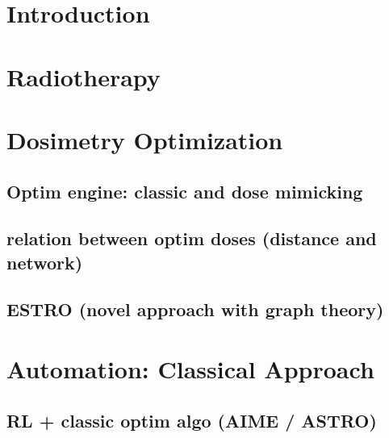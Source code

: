 \documentclass[a4paper]{book}
\begin{document}
	
	
	
	
	
	
	
	\listoffigures
	\listoftables
	\tableofcontents
	\chapterStyleToC
	
	\chapter{Introduction}
	\begin{chapterabstract}
		
	\end{chapterabstract}
	\clearpage
	\localtableofcontents
	
	
	\chapter{Radiotherapy}
	\begin{chapterabstract}
		
	\end{chapterabstract}
	\clearpage
	\localtableofcontents
	
	
	\chapter{Dosimetry Optimization}
	\begin{chapterabstract}
	\end{chapterabstract}
	\clearpage
	\localtableofcontents
	\section{Optim engine: classic and dose mimicking}
	\section{relation between optim doses (distance and network)}
	\section{ESTRO (novel approach with graph theory)}
	
	\chapter{Automation: Classical Approach}
	\begin{chapterabstract}
	\end{chapterabstract}
	\clearpage
	\localtableofcontents
	\section{RL + classic optim algo (AIME / ASTRO)}
	
\end{document}
